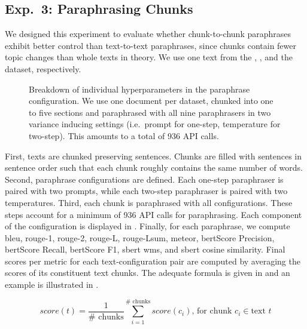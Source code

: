 \subsection{Exp.\ 3: Paraphrasing Chunks}
\label{subsec:paraphrasing_chunks}

We designed this experiment to evaluate whether chunk-to-chunk paraphrases exhibit better control than text-to-text paraphrases, since chunks contain fewer topic changes than whole texts in theory.
We use one text from the \dataBlog{}, \dataGutenberg{}, and the \dataStudent{} dataset, respectively.


\begin{figure}[htbp]
  \centering
  
  \caption[Paraphrase configuration hyperparameters.]{Breakdown of individual hyperparameters in the paraphrase configuration.
  We use one document per dataset, chunked into one to five sections and paraphrased with all nine paraphrasers in two variance inducing settings (i.e.\ prompt for one-step, temperature for two-step).
  This amounts to a total of 936 API calls. 
  }
  \label{fig:chunks_api_calls}
\end{figure}


First, texts are chunked preserving sentences.
Chunks are filled with sentences in sentence order such that each chunk roughly contains the same number of words.
Second, paraphrase configurations are defined.
Each one-step paraphraser is paired with two prompts, while each two-step paraphraser is paired with two temperatures.
Third, each chunk is paraphrased with all configurations.
These steps account for a minimum of 936 API calls for paraphrasing.
Each component of the configuration is displayed in .
Finally, for each paraphrase, we compute \ac{bleu}, \ac{rouge}-1, \ac{rouge}-2, \ac{rouge}-L, \ac{rouge}-Lsum, \ac{meteor}, \ac{bert}\-Score Precision, \ac{bert}\-Score Recall, \ac{bert}\-Score F1, \ac{sbert} \ac{wms}, and \ac{sbert} cosine similarity.
Final scores per metric for each text-configuration pair are computed by averaging the scores of its constituent text chunks.
The adequate formula is given in  and an example is illustrated in .

\begin{equation}
    score(t) = \frac{1}{\#\text{ chunks}}\sum_{i=1}^{\#\text{ chunks}}score(c_i)\text{, for chunk }c_i \in \text{text }t
\label{eq:avg_chunks}
\end{equation}


